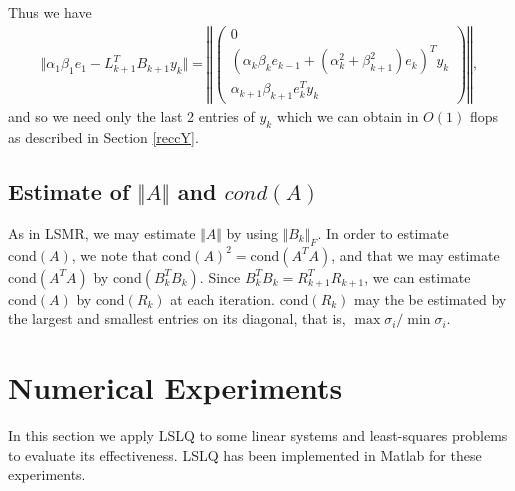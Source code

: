 \documentclass[11pt]{article}
\begin{document}
Thus we have
\begin{eqnarray*}
\Vert \alpha_1 \beta_1 e_1 - L^T_{k+1} B_{k+1} y_k \Vert = \left\Vert \begin{pmatrix}
0 \\ (\alpha_k \beta_k e_{k-1} + (\alpha^2_k + \beta^2_{k+1}) e_k)^T y_k \\ \alpha_{k+1} \beta_{k+1} e^T_{k} y_k
\end{pmatrix} \right\Vert,
\end{eqnarray*}
and so we need only the last 2 entries of $y_k$ which we can obtain in $O(1)$ flops as described in Section \ref{reccY}.

\subsection{Estimate of $\Vert A \Vert$ and $cond(A)$}
As in LSMR, we may estimate $\Vert A \Vert$ by using $\Vert B_k \Vert_F$. In order to estimate $\text{cond} (A)$, we note that $\text{cond}(A)^2 = \text{cond}(A^T A)$, and that we may estimate $\text{cond}(A^T A)$ by $\text{cond}(B_k^T B_k)$. Since $B_k^T B_k = R_{k+1}^T R_{k+1}$, we can estimate $\text{cond}(A)$ by $\text{cond}(R_k)$ at each iteration. $\text{cond}(R_k)$ may the be estimated by the largest and smallest entries on its diagonal, that is, $\max \sigma_i / \min \sigma_i$.

\section{Numerical Experiments}
In this section we apply LSLQ to some linear systems and least-squares problems to evaluate its effectiveness. LSLQ has been implemented in Matlab for these experiments.
\end{document}

